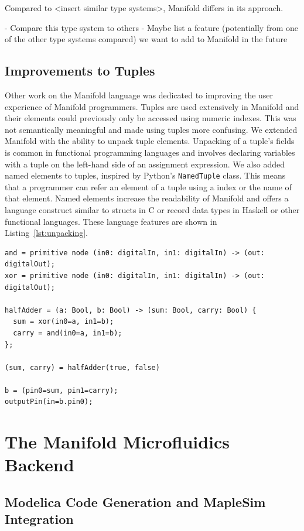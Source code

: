 Compared to <insert similar type systems>, Manifold differs in its approach.

- Compare this type system to others
- Maybe list a feature (potentially from one of the other type systems compared) we want to add to Manifold in the future

\subsection{Improvements to Tuples}

Other work on the Manifold language was dedicated to improving the user experience
of Manifold programmers. Tuples are used extensively in Manifold and their
elements could previously only be accessed using numeric indexes. This was not
semantically meaningful and made using tuples more confusing. We extended
Manifold with the ability to unpack tuple elements. Unpacking of a tuple's
fields is common in functional programming languages and involves declaring
variables with a tuple on the left-hand side of an assignment expression. We
also added named elements to tuples, inspired by Python's \texttt{NamedTuple}
class. This means that a programmer can refer an element of a tuple using a
index or the name of that element. Named elements increase the readability of
Manifold and offers a language construct similar to structs in C or record
data types in Haskell or other functional languages. These language features
are shown in Listing~\ref{lst:unpacking}.

\begin{lstlisting}[label=lst:unpacking, caption=A module imported into a Manifold file]
and = primitive node (in0: digitalIn, in1: digitalIn) -> (out: digitalOut);
xor = primitive node (in0: digitalIn, in1: digitalIn) -> (out: digitalOut);

halfAdder = (a: Bool, b: Bool) -> (sum: Bool, carry: Bool) {
  sum = xor(in0=a, in1=b);
  carry = and(in0=a, in1=b);
};

(sum, carry) = halfAdder(true, false)

b = (pin0=sum, pin1=carry);
outputPin(in=b.pin0);
\end{lstlisting}

\section{The Manifold Microfluidics Backend}

\subsection{Modelica Code Generation and MapleSim Integration}

